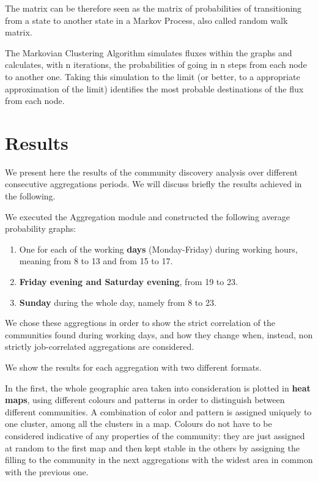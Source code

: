 \documentclass[12pt,a4paper]{article}
\begin{document}
The matrix can be therefore seen as the matrix of probabilities
of transitioning from a state to another state in
a Markov Process, also called random walk matrix.

The Markovian Clustering Algorithm simulates fluxes within the
graphs and calculates, with n iterations, the probabilities of going in
n steps from each node to another one. Taking this simulation to the limit
(or better, to a appropriate approximation of the limit) identifies
the most probable destinations of the flux from each node.



\newpage

\section{Results}
\label{results}

We present here the results of the community discovery analysis
over different consecutive aggregations periods. %
We will discuss briefly the results
achieved in the following.

We executed the Aggregation module and constructed
the following average probability graphs:
\begin{enumerate}
\item One for each of the working \textbf{days} (Monday-Friday) during working hours, meaning from 8 to 13 and from 15 to 17.
\item \textbf{Friday evening and Saturday evening}, from 19 to 23.
\item \textbf{Sunday} during the whole day, namely from 8 to 23.
\end{enumerate}

We chose these aggregtions in order to show the strict correlation of the communities found during working days, and how they change when, instead,
non strictly job-correlated aggregations are considered. 

We show the results for each aggregation with two different formats.

In the first, the whole geographic area taken into consideration is plotted in 
\textbf{heat maps}, using different colours and patterns in order to distinguish between different communities. A combination of color and pattern is assigned uniquely to one cluster, among all the clusters
in a map. Colours do not have to be considered indicative of any properties of the community: they are just assigned at random to the first map and then kept stable in the others by assigning the filling to the community in the next aggregations with the widest area in common with the previous one.
\end{document}

